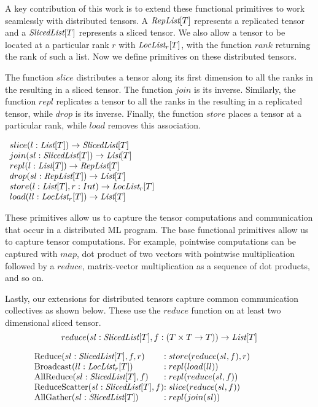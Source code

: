 A key contribution of this work is to extend these functional primitives to work seamlessly
with distributed tensors. A $\RepList{T}$ represents a replicated tensor and a $\SlicedList{T}$ represents a sliced tensor. We also allow a tensor to be located at a particular rank $r$ with $\LocList{T}{r}$, with the function $rank$ returning the rank of such a list. Now we define primitives on these distributed tensors. 

The function $slice$ distributes a tensor along its first dimension to all the ranks in the \WORLD resulting in a sliced tensor. The function $join$ is its inverse. Similarly, the function $repl$ replicates a tensor to all the ranks in the \WORLD resulting in a replicated tensor, while $drop$ is its inverse. 
Finally, the function $store$ places a tensor at a particular rank, while $load$ removes this association. 
\begin{center}
$
\begin{array}{l}
\funcdef{slice}{l: \List{T}}{\SlicedList{T}}\\
\funcdef{join}{sl: \SlicedList{T}}{\List{T}}\\
\funcdef{repl}{l: \List{T}}{\RepList{T}}\\  
\funcdef{drop}{sl: \RepList{T}}{\List{T}}\\
\funcdef{store}{l: \List{T}, r: Int}{\LocList{T}{r}} \\
\funcdef{load}{ll: \LocList{T}{r}}{\List{T}}
\end{array}
$
\end{center}

These primitives allow us to capture the tensor computations and communication that occur in a distributed ML program. The base functional primitives allow us to capture tensor computations. For example, pointwise computations can be captured with $map$, dot product of two vectors with pointwise multiplication followed by a $reduce$, matrix-vector multiplication as a sequence of dot products, and so on. 

Lastly, our extensions for distributed tensors capture common communication collectives as shown below. 
These use the $reduce$ function on at least two dimensional sliced tensor.
$$\funcdef{reduce}{sl: \SlicedList{T}, f : (T \times T \rightarrow T)}{\List{T}}$$

\begin{figure}[H]
$
\begin{array}{l@{}l}
\text{Reduce}(sl: \SlicedList{T}, f, r) &: store(reduce(sl, f), r)\\
\text{Broadcast}(ll: \LocList{T}{r}) &: repl(load(ll))\\
\text{AllReduce}(sl: \SlicedList{T}, f) &: repl(reduce(sl, f))\\
\text{ReduceScatter}(sl: \SlicedList{T}, f) &: slice(reduce(sl, f))\\
\text{AllGather}(sl: \SlicedList{T}) &: repl(join(sl))\\
\end{array}
$
\end{figure}

